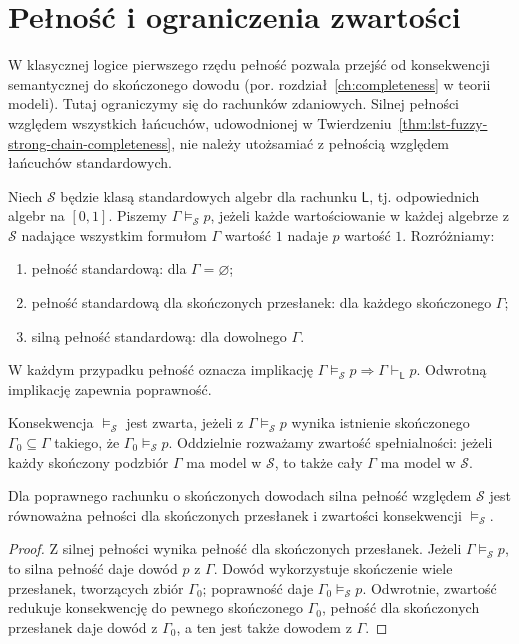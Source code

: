 \section{Pełność i ograniczenia zwartości}
W klasycznej logice pierwszego rzędu pełność pozwala przejść od
konsekwencji semantycznej do skończonego dowodu
(por. rozdział~\ref{ch:completeness} w teorii modeli).
Tutaj ograniczymy się do rachunków zdaniowych. Silnej pełności
względem wszystkich łańcuchów, udowodnionej w
Twierdzeniu~\ref{thm:lst-fuzzy-strong-chain-completeness},
nie należy utożsamiać z pełnością względem łańcuchów standardowych.

\begin{definicja}
\label{def:lst-fuzzy-standard-completeness}
Niech $\mathcal S$ będzie klasą standardowych algebr dla
rachunku $\mathsf L$, tj. odpowiednich algebr na $[0,1]$.
Piszemy $\Gamma\models_{\mathcal S}p$, jeżeli każde wartościowanie
w każdej algebrze z $\mathcal S$ nadające wszystkim formułom
$\Gamma$ wartość $1$ nadaje $p$ wartość $1$. Rozróżniamy:
\begin{enumerate}
\item pełność standardową: dla $\Gamma=\varnothing$;
\item pełność standardową dla skończonych przesłanek:
      dla każdego skończonego $\Gamma$;
\item silną pełność standardową: dla dowolnego $\Gamma$.
\end{enumerate}
W każdym przypadku pełność oznacza implikację
$\Gamma\models_{\mathcal S}p\Rightarrow\Gamma\vdash_{\mathsf L}p$.
Odwrotną implikację zapewnia poprawność.
\end{definicja}

\begin{definicja}
\label{def:ncl-semantic-compactness}
Konsekwencja $\models_{\mathcal S}$ jest zwarta, jeżeli
z $\Gamma\models_{\mathcal S}p$ wynika istnienie
skończonego $\Gamma_0\subseteq\Gamma$ takiego, że
$\Gamma_0\models_{\mathcal S}p$.
Oddzielnie rozważamy zwartość spełnialności:
jeżeli każdy skończony podzbiór $\Gamma$ ma model w
$\mathcal S$, to także cały $\Gamma$ ma model w $\mathcal S$.
\end{definicja}

\begin{stwierdzenie}
\label{prop:ncl-compactness-completeness}
Dla poprawnego rachunku o skończonych dowodach silna
pełność względem $\mathcal S$ jest równoważna pełności
dla skończonych przesłanek i zwartości konsekwencji
$\models_{\mathcal S}$.
\end{stwierdzenie}
\begin{proof}
Z silnej pełności wynika pełność dla skończonych
przesłanek. Jeżeli $\Gamma\models_{\mathcal S}p$,
to silna pełność daje dowód $p$ z $\Gamma$.
Dowód wykorzystuje skończenie wiele przesłanek,
tworzących zbiór $\Gamma_0$; poprawność daje
$\Gamma_0\models_{\mathcal S}p$.
Odwrotnie, zwartość redukuje konsekwencję do pewnego
skończonego $\Gamma_0$, pełność dla skończonych
przesłanek daje dowód z $\Gamma_0$, a ten jest także
dowodem z $\Gamma$.
\end{proof}

